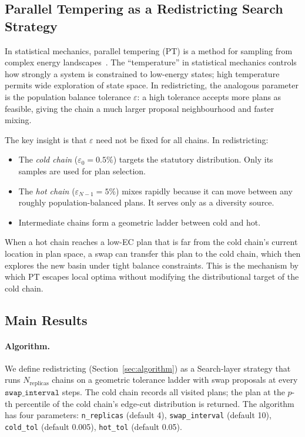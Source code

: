 \subsection{Parallel Tempering as a Redistricting Search Strategy}

In statistical mechanics, parallel tempering (PT) is a method for sampling from
complex energy landscapes~\citep{swendsen1986, geyer1991}.
The ``temperature'' in statistical mechanics controls how strongly a system
is constrained to low-energy states; high temperature permits wide exploration
of state space.
In redistricting, the analogous parameter is the population balance tolerance
$\varepsilon$: a high tolerance accepts more plans as feasible, giving the chain
a much larger proposal neighbourhood and faster mixing.

The key insight is that $\varepsilon$ need not be fixed for all chains.
In \pt{} redistricting:
\begin{itemize}
\item The \emph{cold chain} ($\varepsilon_0 = 0.5\%$) targets the statutory
  distribution.
  Only its samples are used for plan selection.
\item The \emph{hot chain} ($\varepsilon_{N-1} = 5\%$) mixes rapidly because
  it can move between any roughly population-balanced plans.
  It serves only as a diversity source.
\item Intermediate chains form a geometric ladder between cold and hot.
\end{itemize}
When a hot chain reaches a low-EC plan that is far from the cold chain's current
location in plan space, a swap can transfer this plan to the cold chain, which
then explores the new basin under tight balance constraints.
This is the mechanism by which PT escapes local optima without modifying the
distributional target of the cold chain.

\subsection{Main Results}

\paragraph{Algorithm.}
We define \pt{} redistricting (Section~\ref{sec:algorithm}) as a Search-layer
strategy that runs $N_{\mathrm{replicas}}$ \fr{} chains on a geometric tolerance
ladder with swap proposals at every $\mathtt{swap\_interval}$ steps.
The cold chain records all visited plans; the plan at the $p$-th percentile of
the cold chain's edge-cut distribution is returned.
The algorithm has four parameters:
\texttt{n\_replicas} (default 4),
\texttt{swap\_interval} (default 10),
\texttt{cold\_tol} (default 0.005),
\texttt{hot\_tol} (default 0.05).

